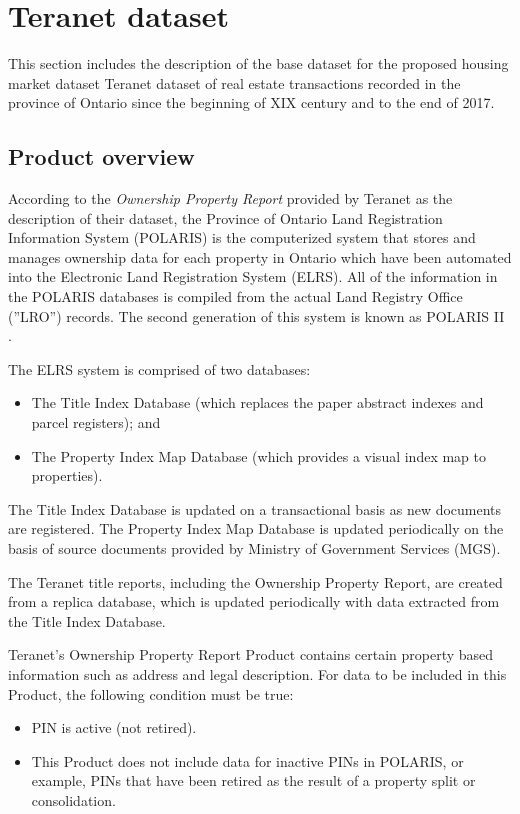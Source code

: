 \section{Teranet dataset} \label{sec:teranet_dataset}

This section includes the description of the base dataset for the proposed housing market dataset \textemdash Teranet dataset of real estate transactions recorded in the province of Ontario since the beginning of XIX century and to the end of 2017.

\subsection{Product overview} \label{subsec:teranet_product_overview}

According to the \textit{Ownership Property Report} provided by Teranet as the description of their dataset\cite{TeranetEnterprisesInc.2011}, the Province of Ontario Land Registration Information System (POLARIS) is the computerized system that stores and manages ownership data for each property in Ontario which have been automated into the Electronic Land Registration System (ELRS).
All of the information in the POLARIS databases is compiled from the actual Land Registry Office (''LRO'') records.
The second generation of this system is known as POLARIS II .

\vspace{5mm}

The ELRS system is comprised of two databases:

\begin{itemize}
    \item The Title Index Database (which replaces the paper abstract indexes and parcel registers); and
    \item The Property Index Map Database (which provides a visual index map to properties).
\end{itemize}

The Title Index Database is updated on a transactional basis as new documents are registered.
The Property Index Map Database is updated periodically on the basis of source documents provided by Ministry of Government Services (MGS).

The Teranet title reports, including the Ownership Property Report, are created from a replica database, which is updated periodically with data extracted from the Title Index Database.

Teranet's Ownership Property Report Product contains certain property based information such as address and legal description.
For data to be included in this Product, the following condition must be true:
\begin{itemize}
    \item PIN is active (not retired).
    \item This Product does not include data for inactive PINs in POLARIS, or example, PINs that have been retired as the result of a property split or consolidation.
\end{itemize}

